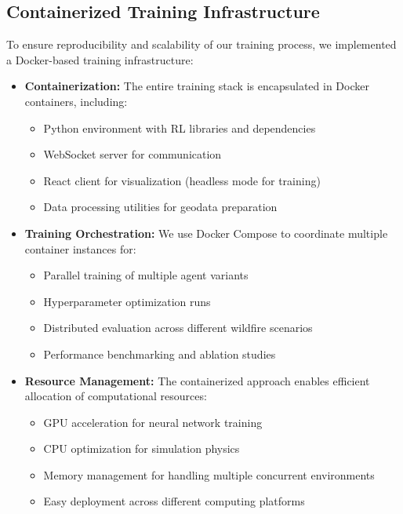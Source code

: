 \documentclass[conference]{IEEEtran}
\begin{document}
\subsection{Containerized Training Infrastructure}

To ensure reproducibility and scalability of our training process, we implemented a Docker-based training infrastructure:

\begin{itemize}
    \item \textbf{Containerization:} The entire training stack is encapsulated in Docker containers, including:
    \begin{itemize}
        \item Python environment with RL libraries and dependencies
        \item WebSocket server for communication
        \item React client for visualization (headless mode for training)
        \item Data processing utilities for geodata preparation
    \end{itemize}
    
    \item \textbf{Training Orchestration:} We use Docker Compose to coordinate multiple container instances for:
    \begin{itemize}
        \item Parallel training of multiple agent variants
        \item Hyperparameter optimization runs
        \item Distributed evaluation across different wildfire scenarios
        \item Performance benchmarking and ablation studies
    \end{itemize}
    
    \item \textbf{Resource Management:} The containerized approach enables efficient allocation of computational resources:
    \begin{itemize}
        \item GPU acceleration for neural network training
        \item CPU optimization for simulation physics
        \item Memory management for handling multiple concurrent environments
        \item Easy deployment across different computing platforms
    \end{itemize}
\end{itemize}
\end{document}
